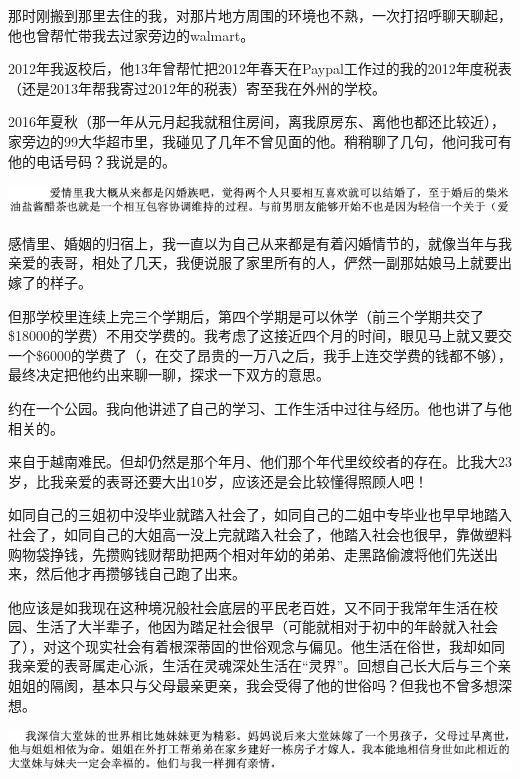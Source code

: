 \documentclass[9pt, b5paper]{article}
\begin{document}
那时刚搬到那里去住的我，对那片地方周围的环境也不熟，一次打招呼聊天聊起，他也曾帮忙带我去过家旁边的walmart。

2012年我返校后，他13年曾帮忙把2012年春天在Paypal工作过的我的2012年度税表（还是2013年帮我寄过2012年的税表）寄至我在外州的学校。

2016年夏秋（那一年从元月起我就租住房间，离我原房东、离他也都还比较近），家旁边的99大华超市里，我碰见了几年不曾见面的他。稍稍聊了几句，他问我可有他的电话号码？我说是的。

\begin{center}
\includegraphics[width=.9\linewidth]{./pic/backups_plans_20210423_203401.png}
\end{center}

感情里、婚姻的归宿上，我一直以为自己从来都是有着闪婚情节的，就像当年与我亲爱的表哥，相处了几天，我便说服了家里所有的人，俨然一副那姑娘马上就要出嫁了的样子。

但那学校里连续上完三个学期后，第四个学期是可以休学（前三个学期共交了\$18000的学费）不用交学费的。我考虑了这接近四个月的时间，眼见马上就又要交一个\$6000的学费了（，在交了昂贵的一万八之后，我手上连交学费的钱都不够），最终决定把他约出来聊一聊，探求一下双方的意思。

约在一个公园。我向他讲述了自己的学习、工作生活中过往与经历。他也讲了与他相关的。 

来自于越南难民。但却仍然是那个年月、他们那个年代里绞绞者的存在。比我大23岁，比我亲爱的表哥还要大出10岁，应该还是会比较懂得照顾人吧！

如同自己的三姐初中没毕业就踏入社会了，如同自己的二姐中专毕业也早早地踏入社会了，如同自己的大姐高一没上完就踏入社会了，他踏入社会也很早，靠做塑料购物袋挣钱，先攒购钱财帮助把两个相对年幼的弟弟、走黑路偷渡将他们先送出来，然后他才再攒够钱自己跑了出来。

他应该是如我现在这种境况般社会底层的平民老百姓，又不同于我常年生活在校园、生活了大半辈子，他因为踏足社会很早（可能就相对于初中的年龄就入社会了），对这个现实社会有着根深蒂固的世俗观念与偏见。他生活在俗世，我却如同我亲爱的表哥属走心派，生活在灵魂深处生活在“灵界”。回想自己长大后与三个亲姐姐的隔阂，基本只与父母最亲更亲，我会受得了他的世俗吗？但我也不曾多想深想。 

\begin{center}
\includegraphics[width=.9\linewidth]{./pic/backups_plans_20210423_211802.png}
\end{center}
\end{document}
